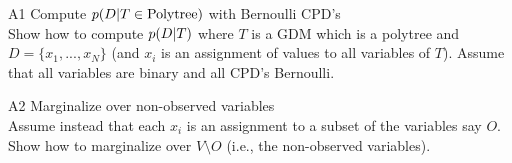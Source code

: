 \documentclass[a4paper,twoside=false,abstract=false,numbers=noenddot,
titlepage=false,headings=small,parskip=half,version=last]{scrartcl}
\begin{document}

\begin{exercise}{A1} Compute $p{(D|T\in{\text{Polytree}})}$ with Bernoulli
    CPD's \\
    Show how to compute $p{(D|T)}$ where $T$ is a GDM which is a polytree and
    $D = \{x_1,...,x_N\}$ (and $x_i$ is an assignment of values to all
    variables of $T$).
    Assume that all variables are binary and all CPD's Bernoulli.
\end{exercise}
\begin{solution}

\end{solution}

\begin{exercise}{A2} Marginalize over non-observed variables \\
    Assume instead that each $x_i$ is an assignment to a subset of the
    variables say $O$.
    Show how to marginalize over $V\setminus O$ (i.e., the non-observed
    variables).
\end{exercise}
\begin{solution}

\end{solution}
\end{document}
